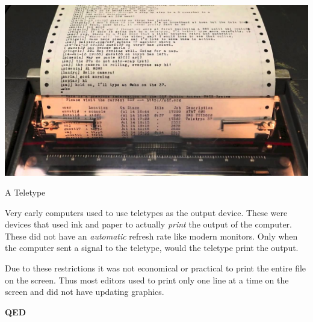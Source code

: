 \begin{marginfigure}
  \includegraphics[width=\linewidth]{images/png/tty.png}
  \caption{A Teletype}
\end{marginfigure}

Very early computers used to use teletypes as the output device.
These were devices that used ink and paper to actually
\textit{print} the output of the computer.
These did not have an \textit{automatic} refresh rate like modern monitors.
Only when the computer sent a signal to the teletype, would the teletype print the output.

Due to these restrictions it was not economical or
practical to print the entire file on the screen.
Thus most editors used to print only one line at a time on the screen
and did not have updating graphics.

\textbf{QED}

